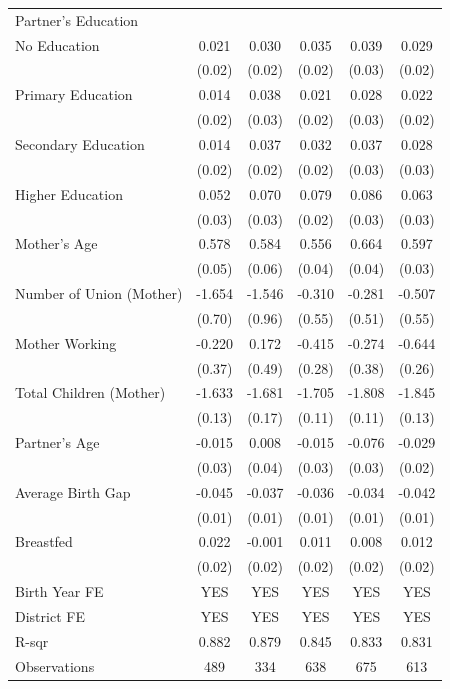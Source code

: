 \begin{longtable}{l*{5}{c}}
\multicolumn{6}{l}{Partner's Education} \\
\hspace{1em}No Education & 0.021 & 0.030 & 0.035 & 0.039 & 0.029 \\
                    & (0.02) & (0.02) & (0.02) & (0.03) & (0.02) \\
\hspace{1em}Primary Education & 0.014 & 0.038 & 0.021 & 0.028 & 0.022 \\
                    & (0.02) & (0.03) & (0.02) & (0.03) & (0.02) \\
\hspace{1em}Secondary Education & 0.014 & 0.037 & 0.032 & 0.037 & 0.028 \\
                    & (0.02) & (0.02) & (0.02) & (0.03) & (0.03) \\
\hspace{1em}Higher Education & 0.052\sym{*} & 0.070\sym{**} & 0.079\sym{***} & 0.086\sym{***} & 0.063\sym{**} \\
                    & (0.03) & (0.03) & (0.02) & (0.03) & (0.03) \\
Mother's Age        & 0.578\sym{***} & 0.584\sym{***} & 0.556\sym{***} & 0.664\sym{***} & 0.597\sym{***} \\
                    & (0.05) & (0.06) & (0.04) & (0.04) & (0.03) \\
Number of Union (Mother) & -1.654\sym{**} & -1.546 & -0.310 & -0.281 & -0.507 \\
                    & (0.70) & (0.96) & (0.55) & (0.51) & (0.55) \\
Mother Working      & -0.220 & 0.172 & -0.415 & -0.274 & -0.644\sym{**} \\
                    & (0.37) & (0.49) & (0.28) & (0.38) & (0.26) \\
Total Children (Mother) & -1.633\sym{***} & -1.681\sym{***} & -1.705\sym{***} & -1.808\sym{***} & -1.845\sym{***} \\
                    & (0.13) & (0.17) & (0.11) & (0.11) & (0.13) \\
Partner's Age       & -0.015 & 0.008 & -0.015 & -0.076\sym{**} & -0.029\sym{*} \\
                    & (0.03) & (0.04) & (0.03) & (0.03) & (0.02) \\
Average Birth Gap   & -0.045\sym{***} & -0.037\sym{***} & -0.036\sym{***} & -0.034\sym{***} & -0.042\sym{***} \\
                    & (0.01) & (0.01) & (0.01) & (0.01) & (0.01) \\
Breastfed          & 0.022 & -0.001 & 0.011 & 0.008 & 0.012 \\
                    & (0.02) & (0.02) & (0.02) & (0.02) & (0.02) \\
\hline
Birth Year FE       & YES & YES & YES & YES & YES \\
District FE         & YES & YES & YES & YES & YES \\
R-sqr               & 0.882 & 0.879 & 0.845 & 0.833 & 0.831 \\
Observations        & 489 & 334 & 638 & 675 & 613 \\
\hline\hline
\end{longtable}